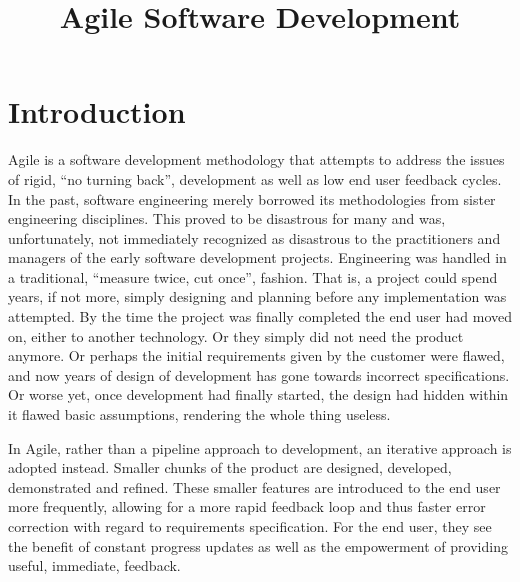 \documentclass{report}
\title{Agile Software Development}
\begin{document}
\maketitle
{}

\section{Introduction}
Agile is a software development methodology that attempts to address the issues of rigid, “no turning back”, development as well as low end user feedback cycles. In the past, software engineering merely borrowed its methodologies from sister engineering disciplines. This proved to be disastrous for many and was, unfortunately, not immediately recognized as disastrous to the practitioners and managers of the early software development projects. Engineering was handled in a traditional, “measure twice, cut once”, fashion. That is, a project could spend years, if not more, simply designing and planning before any implementation was attempted. By the time the project was finally completed the end user had moved on, either to another technology. Or they simply did not need the product anymore. Or perhaps the initial requirements given by the customer were flawed, and now years of design of development has gone towards incorrect specifications. Or worse yet, once development had finally started, the design had hidden within it flawed basic assumptions, rendering the whole thing useless.

In Agile, rather than a pipeline approach to development, an iterative approach is adopted instead. Smaller chunks of the product are designed, developed, demonstrated and refined. These smaller features are introduced to the end user more frequently, allowing for a more rapid feedback loop and thus faster error correction with regard to requirements specification. For the end user, they see the benefit of constant progress updates as well as the empowerment of providing useful, immediate, feedback.
\end{document}
